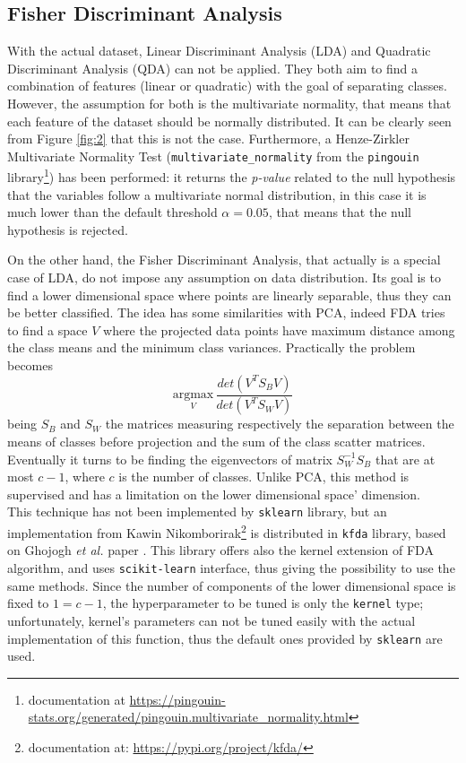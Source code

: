\documentclass[letterpaper]{article}
\begin{document}
	\subsection{Fisher Discriminant Analysis}
	With the actual dataset, Linear Discriminant Analysis (LDA) and Quadratic Discriminant Analysis (QDA) can not be applied. They both aim to find a combination of features (linear or quadratic) with the goal of separating classes. However, the assumption for both is the multivariate normality, that means that each feature of the dataset should be normally distributed. It can be clearly seen from Figure \ref{fig:2} that this is not the case. Furthermore, a Henze-Zirkler Multivariate Normality Test (\texttt{multivariate\_normality} from the \texttt{pingouin} library\footnote{documentation at \url{https://pingouin-stats.org/generated/pingouin.multivariate_normality.html}}) has been performed: it returns the \emph{p-value} related to the null hypothesis that the variables follow a multivariate normal distribution, in this case it is much lower than the default threshold $\alpha = 0.05$, that means that the null hypothesis is rejected.
	\par On the other hand, the Fisher Discriminant Analysis, that actually is a special case of LDA, do not impose any assumption on data distribution. Its goal is to find a lower dimensional space where points are linearly separable, thus they can be better classified. The idea has some similarities with PCA, indeed FDA tries to find a space $V$ where the projected data points have maximum distance among the class means and the minimum class variances. Practically the problem becomes 
	\begin{equation}
		\underset{V}{\mathrm{argmax}}\, \frac{det(V^TS_BV)}{det(V^TS_WV)}
	\end{equation}
	being $S_B$ and $S_W$ the matrices measuring respectively the separation between the means of classes before projection and the sum of the class scatter matrices. Eventually it turns to be finding the eigenvectors of matrix $S_W^{-1}S_B$ that are at most $c-1$, where $c$ is the number of classes.
	Unlike PCA, this method is supervised and has a limitation on the lower dimensional space' dimension.
	\\ This technique has not been implemented by \texttt{sklearn} library, but an implementation from Kawin Nikomborirak\footnote{documentation at: \url{https://pypi.org/project/kfda/}} is distributed in \texttt{kfda} library, based on Ghojogh \emph{et al.} paper \cite{ghojogh2019fisher}. This library offers also the kernel extension of FDA algorithm, and uses \texttt{scikit-learn} interface, thus giving the possibility to use the same methods. Since the number of components of the lower dimensional space is fixed to $1 = c-1$, the hyperparameter to be tuned is only the \texttt{kernel} type; unfortunately, kernel's parameters can not be tuned easily with the actual implementation of this function, thus the default ones provided by \texttt{sklearn} are used.
\end{document}

